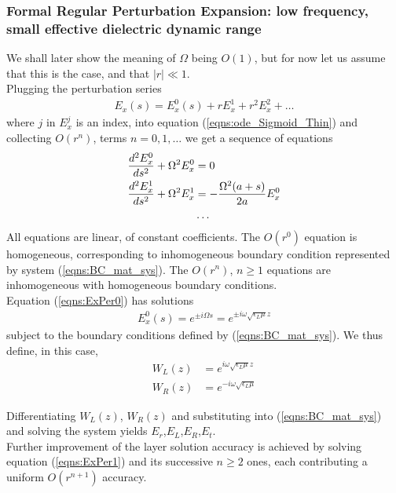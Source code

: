 \documentclass[twocolumn,secnumarabic,amssymb, nobibnotes, aps, prd]{revtex4-1}
\begin{document}
\subsubsection{Formal Regular Perturbation Expansion: low frequency, small effective dielectric dynamic range}
We shall later show the meaning of $\Omega$ being $O(1)$, but for now let us assume that this is the case, and that $|r| \ll 1$. \\
Plugging the perturbation series 
\begin{align}
E_x(s)=E_x^0(s)+r E_x^1 + r^2 E_x^2+ \ldots
\end{align}
where $j$ in $E_x^j$ is an index, into equation (\ref{eqns:ode_Sigmoid_Thin}) and collecting $O(r^n)$, terms $n=0,1, \ldots$ we get a sequence of equations
\begin{subequations}
\begin{align}
\label{eqns:ExPer0}
\dfrac{d^2 E_x^0}{ds^2} + \Omega^2 E_x^0&=0 \\
\label{eqns:ExPer1}
\dfrac{d^2 E_x^1}{ds^2} + \Omega^2 E_x^1&=-\dfrac{\Omega ^2 (a+s)}{2 a} E_x^0 \\
& \ldots \notag
\end{align}
\end{subequations}
All equations are linear, of constant coefficients. The $O(r^0)$ equation is homogeneous, corresponding to inhomogeneous boundary condition  represented by  system (\ref{eqns:BC_mat_sys}). The $O(r^n)$, $n \geq  1$ equations are inhomogeneous with homogeneous boundary conditions. \\
Equation (\ref{eqns:ExPer0}) has solutions
\begin{align}
E_x^0(s) = e^{\pm i \Omega s}=e^{\pm i \omega \sqrt{\epsilon_L \mu} z}
\end{align}  
subject to the boundary conditions defined by (\ref{eqns:BC_mat_sys}). We thus define, in this case,
\begin{subequations}
\begin{align}
W_L(z) &= e^{i \omega \sqrt{\epsilon_L \mu} z}\\
W_R(z) &= e^{-i \omega  \sqrt{\epsilon_L \mu}}
\end{align}
\end{subequations}

Differentiating $W_L(z)$, $W_R(z)$ and substituting into (\ref{eqns:BC_mat_sys}) and solving the system yields $E_r$,$E_L$,$E_R$,$E_t$.\\
Further improvement of the layer solution accuracy is achieved by solving equation (\ref{eqns:ExPer1}) and its successive $n \geq 2$ ones, each contributing a uniform $O(r^{n+1})$ accuracy.
\end{document}
